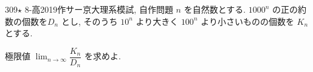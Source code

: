 \begin{prob}{309}{$\star$ 8-高}{2019作サー京大理系模試, 自作問題}
$n$ を自然数とする. $1000^n$ の正の約数の個数を$D_n$ とし, そのうち $10^n$ より大きく $100^n$ より小さいものの個数を $K_n$ とする. 

極限値 $\displaystyle\lim_{n\to \infty} \dfrac{K_n}{D_n}$ を求めよ.
\end{prob}
